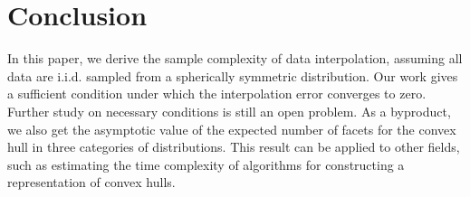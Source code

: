 \documentclass[conference,a4paper]{IEEEtran}
\begin{document}
\section{Conclusion}
\label{sec:conclusion}
In this paper, we derive the sample complexity of data interpolation,
assuming all data are i.i.d. sampled from a spherically symmetric distribution.
Our work gives a sufficient
condition under which the interpolation error converges to zero.
Further study on necessary conditions is still an open problem.
As a byproduct, we also get the asymptotic value of the expected
number of facets for the convex hull in three categories of distributions.
This result can be applied
to other fields, such as estimating the time complexity of algorithms
for constructing a representation of convex hulls.




%



\appendix
\end{document}
